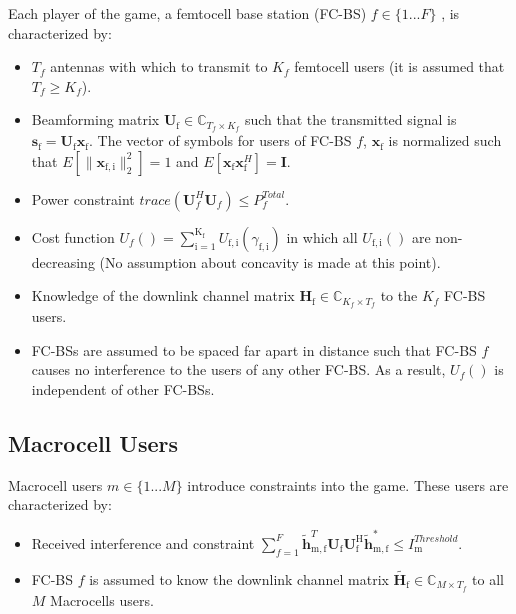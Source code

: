 \documentclass[12pt,a4paper]{report}
\begin{document}
Each player of the game, a femtocell base station (FC-BS) $f \in \{1 ... F\}$ , is characterized by:
\begin{itemize}
\item 
$T_f$ antennas with which to transmit to $K_f$ femtocell users (it is assumed that $T_f \geq K_f$).
\\
\item 
	Beamforming matrix $\mathbf{U}_{\mathrm{f}} \in \mathbb{C}_{T_f \times K_f}$ such that the transmitted 		
	signal is $\mathbf{s}_{\mathrm{f}
	}= \mathbf{U_{\mathrm{f}}}\mathbf{x_{\mathrm{f}}}$. The 		
	vector of symbols for users of FC-BS $f$, $\mathbf{x_{\mathrm{f}}}$ is  normalized such that $E[\|\mathbf{x}_{\mathrm{f,i}}
	\|_2^2]=1$ and $E[\mathbf{x}_{\mathrm{f}}\mathbf{x}_{\mathrm{f}}^H]=\mathbf{I}$.
\\
\item 
	Power constraint $trace(\mathbf{U}_f^H\mathbf{U}_f) \leq P^{Total}_{f} $.

\item 
	Cost function $U_f() =
	\sum_{\mathrm{i=1}}^{\mathrm{K_f}}
    	 U_{\mathrm{f,i}}(\gamma_{\mathrm{f,i}}) $
    	in which all $U_{\mathrm{f,i}}()$ are non-decreasing (No assumption about concavity is made at this point).

\item 
	Knowledge of the downlink channel matrix $\mathbf{H_\mathrm{f}} \in \mathbb{C}_{K_f \times T_f} $ to the $K_f$ FC-BS users.
\\
\item
	 FC-BSs are assumed to be spaced far apart in distance such that FC-BS $f$ 
	 causes no interference to the users of any other FC-BS. As a result, $U_f()$ is independent of other FC-BSs.
\end{itemize}

\subsection{Macrocell Users}
Macrocell users $m \in \{1 ... M\}$ introduce constraints into the game. These users are characterized by:

\begin{itemize}
\item 
	Received interference and constraint
	$\sum^F_{f=1} \mathbf{\tilde{h}}_{\mathrm{m,f}}^T  \mathbf{U_{\mathrm{f}}} 						
	\mathbf{U_{\mathrm{f}}^{\mathrm{H}}} \mathbf{\tilde{h}_{\mathrm{m,f}}^*} \leq I^{Threshold}		
	_{\mathrm{m}} $.

\item 
	FC-BS $f$ is assumed to know the downlink channel matrix $\tilde{\mathbf{H}_{\mathrm{f}}} \in \mathbb{C}_{M \times T_f}$ to all $M$ Macrocells users.
\\
\end{itemize}
\end{document}
